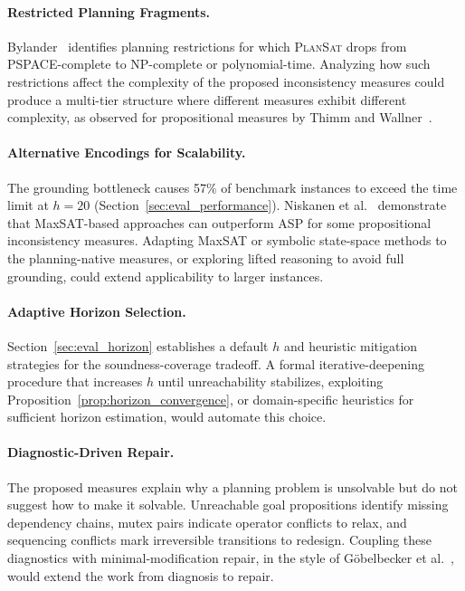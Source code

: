 \paragraph{Restricted Planning Fragments.}
Bylander~\cite{Bylander1994} identifies planning restrictions for which \textsc{PlanSat} drops from PSPACE-complete to NP-complete or polynomial-time. Analyzing how such restrictions affect the complexity of the proposed inconsistency measures could produce a multi-tier structure where different measures exhibit different complexity, as observed for propositional measures by Thimm and Wallner~\cite{Thimm2016}.

\paragraph{Alternative Encodings for Scalability.}
The grounding bottleneck causes 57\% of benchmark instances to exceed the time limit at $h = 20$ (Section~\ref{sec:eval_performance}). Niskanen et al.~\cite{Niskanen2023} demonstrate that MaxSAT-based approaches can outperform \ac{ASP} for some propositional inconsistency measures. Adapting MaxSAT or symbolic state-space methods to the planning-native measures, or exploring lifted reasoning to avoid full grounding, could extend applicability to larger instances.

\paragraph{Adaptive Horizon Selection.}
Section~\ref{sec:eval_horizon} establishes a default $h$ and heuristic mitigation strategies for the soundness-coverage tradeoff. A formal iterative-deepening procedure that increases $h$ until unreachability stabilizes, exploiting Proposition~\ref{prop:horizon_convergence}, or domain-specific heuristics for sufficient horizon estimation, would automate this choice.

\paragraph{Diagnostic-Driven Repair.}
The proposed measures explain why a planning problem is unsolvable but do not suggest how to make it solvable. Unreachable goal propositions identify missing dependency chains, mutex pairs indicate operator conflicts to relax, and sequencing conflicts mark irreversible transitions to redesign. Coupling these diagnostics with minimal-modification repair, in the style of G{\"o}belbecker et al.~\cite{Goebelbecker2010}, would extend the work from diagnosis to repair.
